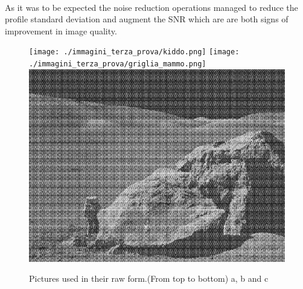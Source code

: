 \documentclass{article}
\begin{document}
\\As it was to be expected the noise reduction operations managed to reduce the profile standard deviation and augment the SNR which are are both signs of improvement in image quality.

\begin{figure}[h]
\centering
\texttt{[image: ./immagini\_terza\_prova/kiddo.png]}
\bigbreak
\texttt{[image: ./immagini\_terza\_prova/griglia\_mammo.png]}
\bigbreak
\includegraphics[width=.4\textwidth]{./immagini_terza_prova/moonlanding.png}
\caption{Pictures used in their raw form.(From top to bottom) a, b and c}\label{two}
\end{figure}
\end{document}
